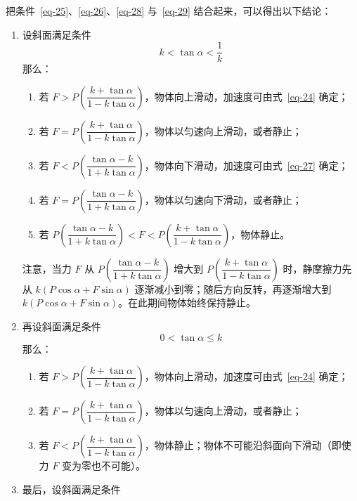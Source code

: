\begin{dialogue}
把条件~\eqref{eq-25}、\eqref{eq-26}、\eqref{eq-28} 与~\eqref{eq-29} 结合起来，可以得出以下结论：
\begin{enumerate}[label=\textbf{(\arabic*)},leftmargin=1cm]
\item 设斜面满足条件
\begin{equation*}%
k < \tan \alpha < \frac{1}{k}
\end{equation*}
那么：
\begin{enumerate}[label=\textbf{(\alph*)},leftmargin=1cm]
\item 若 $F>P \left(\dfrac{k+\tan \alpha}{ 1-k \tan \alpha}\right)$，物体向上滑动，加速度可由式~\eqref{eq-24} 确定；
\item 若 $F=P \left(\dfrac{k+\tan \alpha}{ 1-k \tan \alpha}\right)$，物体以匀速向上滑动，或者静止；
\item 若 $F<P \left(\dfrac{\tan \alpha - k}{ 1+k \tan \alpha}\right)$，物体向下滑动，加速度可由式~\eqref{eq-27} 确定；
\item 若 $F=P \left(\dfrac{\tan \alpha-k}{1+k \tan \alpha}\right)$，物体以匀速向下滑动，或者静止；
\item 若 $P\left( \dfrac{\tan \alpha-k}{1+k \tan \alpha}\right) < F < P \left( \dfrac{k+\tan \alpha}{1-k \tan \alpha} \right)$，物体静止。
\end{enumerate}
注意，当力 $F$ 从 $P \left(\dfrac{\tan \alpha-k}{1 +k \tan \alpha}\right)$ 增大到 $P \left( \dfrac{k+\tan \alpha} {1-k \tan \alpha} \right)$ 时，静摩擦力先从 $k (P \cos \alpha +F \sin \alpha)$ 逐渐减小到零；随后方向反转，再逐渐增大到 $k (P \cos \alpha +F \sin \alpha)$。在此期间物体始终保持静止。
\item 再设斜面满足条件
\begin{equation*}%
0 < \tan \alpha \leqslant k
\end{equation*}
那么：
\begin{enumerate}[label=\textbf{(\alph*)},leftmargin=1cm]
\item 若 $F>P \left(\dfrac{k+\tan \alpha}{ 1-k \tan \alpha}\right)$，物体向上滑动，加速度可由式~\eqref{eq-24} 确定；
\item 若 $F=P \left(\dfrac{k+\tan \alpha}{ 1-k \tan \alpha}\right)$，物体以匀速向上滑动，或者静止；
\item 若 $F<P \left(\dfrac{k+\tan \alpha}{ 1-k \tan \alpha}\right)$，物体静止；物体不可能沿斜面向下滑动（即使力 $F$ 变为零也不可能）。
\end{enumerate}
\item 最后，设斜面满足条件
\begin{equation*}%

\end{equation*}
\end{enumerate}
\end{dialogue}
